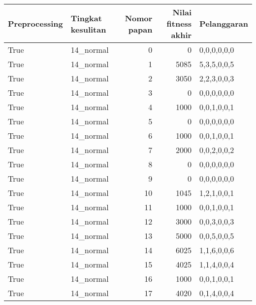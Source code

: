 \begin{tabular}{llrrl}
\hline
 Preprocessing   & Tingkat kesulitan   &   Nomor papan &   Nilai fitness akhir & Pelanggaran   \\
\hline
 True            & 14\_normal           &             0 &                     0 & 0,0,0,0,0,0   \\
 True            & 14\_normal           &             1 &                  5085 & 5,3,5,0,0,5   \\
 True            & 14\_normal           &             2 &                  3050 & 2,2,3,0,0,3   \\
 True            & 14\_normal           &             3 &                     0 & 0,0,0,0,0,0   \\
 True            & 14\_normal           &             4 &                  1000 & 0,0,1,0,0,1   \\
 True            & 14\_normal           &             5 &                     0 & 0,0,0,0,0,0   \\
 True            & 14\_normal           &             6 &                  1000 & 0,0,1,0,0,1   \\
 True            & 14\_normal           &             7 &                  2000 & 0,0,2,0,0,2   \\
 True            & 14\_normal           &             8 &                     0 & 0,0,0,0,0,0   \\
 True            & 14\_normal           &             9 &                     0 & 0,0,0,0,0,0   \\
 True            & 14\_normal           &            10 &                  1045 & 1,2,1,0,0,1   \\
 True            & 14\_normal           &            11 &                  1000 & 0,0,1,0,0,1   \\
 True            & 14\_normal           &            12 &                  3000 & 0,0,3,0,0,3   \\
 True            & 14\_normal           &            13 &                  5000 & 0,0,5,0,0,5   \\
 True            & 14\_normal           &            14 &                  6025 & 1,1,6,0,0,6   \\
 True            & 14\_normal           &            15 &                  4025 & 1,1,4,0,0,4   \\
 True            & 14\_normal           &            16 &                  1000 & 0,0,1,0,0,1   \\
 True            & 14\_normal           &            17 &                  4020 & 0,1,4,0,0,4   \\

\end{tabular}
